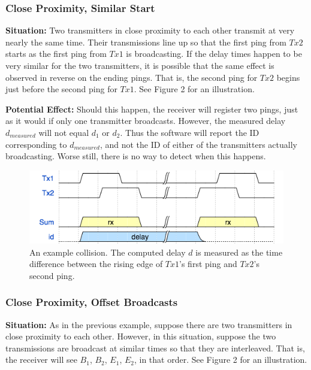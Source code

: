 \documentclass[12pt]{article}
\begin{document}
\subsubsection{Close Proximity, Similar Start}

{\bf Situation:} Two transmitters in close proximity to each other transmit at
very nearly the same time.
Their transmissions line up so that the first ping from $Tx2$ starts as the
first ping from $Tx1$ is broadcasting.
If the delay times happen to be very similar for the two transmitters,
it is possible that the same effect is observed in reverse on the ending
pings. That is, the second ping for $Tx2$ begins just before the second ping
for $Tx1$. See Figure 2 for an illustration.

{\bf Potential Effect:}
Should this happen, the receiver will register two pings, just as it would if
only one transmitter broadcasts. However, the measured delay
$d_{measured}$ will not equal $d_1$ or $d_2$.
Thus the software will report the ID corresponding to $d_{measured}$, and
not the ID of either of the transmitters actually broadcasting. Worse still,
there is no way to detect when this happens.

\begin{figure}[h]
	\centering
		\includegraphics[scale=0.7]{collision1}
		
		\caption{An example collision. The computed delay $d$ is
		measured as the time difference between the rising edge of
		$Tx1$'s first ping and $Tx2$'s second ping.}
\end{figure}

\subsubsection{Close Proximity, Offset Broadcasts}

{\bf Situation:} As in the previous example, suppose there are two transmitters
in close proximity to each other.
However, in this situation, suppose the two transmissions are broadcast at
similar times so that they are interleaved.
That is, the receiver will see $B_1$, $B_2$, $E_1$, $E_2$, in that order.
See Figure 2 for an illustration.
\end{document}
